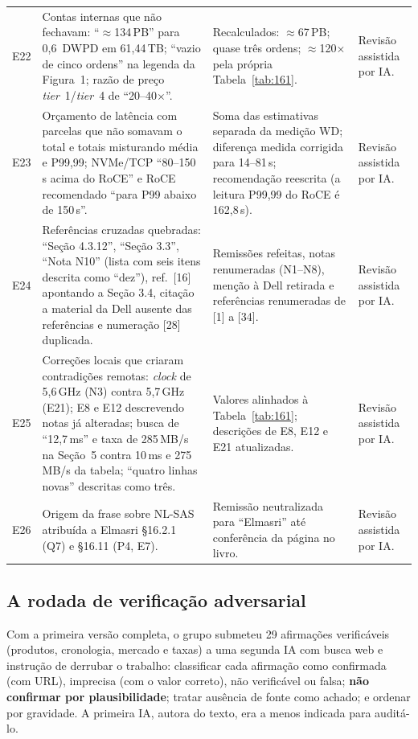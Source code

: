 \documentclass[11pt,a4paper]{article}
\newcommand{\us}{\,\textmu s}
\begin{document}
{\begin{longtable}{@{}p{0.7cm}>{\RaggedRight\arraybackslash}p{5.5cm}>{\RaggedRight\arraybackslash}p{5.6cm}>{\RaggedRight\arraybackslash}p{2.8cm}@{}}
E22 & Contas internas que não fechavam: ``$\approx$134\,PB'' para 0,6~DWPD em 61,44\,TB; ``vazio de cinco ordens'' na legenda da Figura~1; razão de preço \emph{tier}~1/\emph{tier}~4 de ``20--40$\times$''. & Recalculados: $\approx$67\,PB; quase três ordens; $\approx$120$\times$ pela própria Tabela~\ref{tab:161}. & Revisão assistida por IA. \\
E23 & Orçamento de latência com parcelas que não somavam o total e totais misturando média e P99,99; NVMe/TCP ``80--150\us{} acima do RoCE'' e RoCE recomendado ``para P99 abaixo de 150\us''. & Soma das estimativas separada da medição WD; diferença medida corrigida para 14--81\us; recomendação reescrita (a leitura P99,99 do RoCE é 162,8\us). & Revisão assistida por IA. \\
E24 & Referências cruzadas quebradas: ``Seção 4.3.12'', ``Seção 3.3'', ``Nota N10'' (lista com seis itens descrita como ``dez''), ref.~[16] apontando a Seção 3.4, citação a material da Dell ausente das referências e numeração [28] duplicada. & Remissões refeitas, notas renumeradas (N1--N8), menção à Dell retirada e referências renumeradas de [1] a [34]. & Revisão assistida por IA. \\
E25 & Correções locais que criaram contradições remotas: \emph{clock} de 5,6\,GHz (N3) contra 5,7\,GHz (E21); E8 e E12 descrevendo notas já alteradas; busca de ``12,7\,ms'' e taxa de 285\,MB/s na Seção~5 contra 10\,ms e 275\,MB/s da tabela; ``quatro linhas novas'' descritas como três. & Valores alinhados à Tabela~\ref{tab:161}; descrições de E8, E12 e E21 atualizadas. & Revisão assistida por IA. \\
E26 & Origem da frase sobre NL-SAS atribuída a Elmasri §16.2.1 (Q7) e §16.11 (P4, E7). & Remissão neutralizada para ``Elmasri'' até conferência da página no livro. & Revisão assistida por IA. \\
\end{longtable}
}

\subsection{A rodada de verificação adversarial}

Com a primeira versão completa, o grupo submeteu 29 afirmações verificáveis (produtos,
cronologia, mercado e taxas) a uma segunda IA com busca web e instrução de derrubar o
trabalho: classificar cada afirmação como confirmada (com URL), imprecisa (com o valor
correto), não verificável ou falsa; \textbf{não confirmar por plausibilidade}; tratar ausência
de fonte como achado; e ordenar por gravidade. A primeira IA, autora do texto, era a menos
indicada para auditá-lo.
\end{document}
